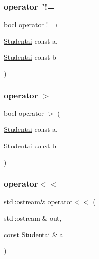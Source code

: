 \subsubsection{\texorpdfstring{operator "!=}{operator !=}}
{\footnotesize\ttfamily bool operator != (\begin{DoxyParamCaption}\item[{\mbox{\hyperlink{class_studentai}{Studentai}} const}]{a,  }\item[{\mbox{\hyperlink{class_studentai}{Studentai}} const}]{b }\end{DoxyParamCaption})\hspace{0.3cm}{\ttfamily [friend]}}

\mbox{\label{class_studentai_a3cc21bd1970b311949cd76aa93c5cf4f}} 
\subsubsection{\texorpdfstring{operator $>$}{operator >}}
{\footnotesize\ttfamily bool operator $>$ (\begin{DoxyParamCaption}\item[{\mbox{\hyperlink{class_studentai}{Studentai}} const}]{a,  }\item[{\mbox{\hyperlink{class_studentai}{Studentai}} const}]{b }\end{DoxyParamCaption})\hspace{0.3cm}{\ttfamily [friend]}}

\mbox{\label{class_studentai_a7fa0ac541336749ef2d674fd1996e8d5}} 
\subsubsection{\texorpdfstring{operator$<$$<$}{operator<<}}
{\footnotesize\ttfamily std\+::ostream\& operator$<$$<$ (\begin{DoxyParamCaption}\item[{std\+::ostream \&}]{out,  }\item[{const \mbox{\hyperlink{class_studentai}{Studentai}} \&}]{a }\end{DoxyParamCaption})\hspace{0.3cm}{\ttfamily [friend]}}

